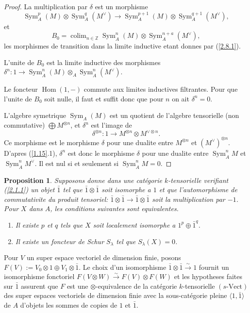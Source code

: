 \documentclass[11pt,a4paper]{article}
\theoremstyle{plain}
\newtheorem{proposition}[theorem]{Proposition}
\theoremstyle{definition}
\DeclareMathOperator{\Hom}{Hom}
\DeclareMathOperator{\Sym}{Sym}
\DeclareMathOperator*{\colim}{colim}
\newcommand{\Vect}{\mathrm{Vect}}
\begin{document}
\begin{proof}
La multiplication par $\delta$ est un morphisme
\begin{equation}\label{2.8.1}
\Sym^p_A(M)\otimes\Sym^q_A(M^\vee)\to\Sym^{p+1}_A(M)\otimes\Sym^{q+1}_A(M^\vee),
\end{equation}
et
\[
B_0=\colim_{n\in\mathbb{Z}}\Sym^n_A(M)\otimes\Sym^{n+a}_A(M^\vee),
\]
les morphismes de transition dans la limite inductive etant donnes par (\ref{2.8.1}).

L'unite de $B_0$ est la limite inductive des morphismes $\delta^n:1\to\Sym^n_A(M)\otimes_A\Sym^n_A(M^\vee)$.

Le foncteur $\Hom(1,{-})$ commute aux limites inductives filtrantes. Pour que l'unite de $B_0$ soit nulle, il faut et suffit donc que pour $n$ on ait $\delta^n=0$.

L'algebre symetrique $\Sym_A(M)$ est un quotient de l'algebre tensorielle (non commutative) $\bigoplus M^{\otimes n}$, et $\delta^n$ est l'image de
\[
\delta^{\otimes n}:1\to M^{\otimes n}\otimes M^{\vee\otimes n}.
\]
Ce morphisme est le morphisme $\delta$ pour une dualite entre $M^{\otimes n}$ et $(M^{\vee})^{\otimes n}$. D'apres (\ref{1.15}.1), $\delta^n$ est donc le morphisme $\delta$ pour une dualite entre $\Sym^n_A M$ et $\Sym^n_A M^\vee$. Il est nul si et seulement si $\Sym^n_A M=0$.
\end{proof}

\begin{proposition}\label{2.9}
Supposons donne dans une cat\'egorie $k$-tensorielle verifiant (\ref{2.1.1}) un objet $\bar{1}$ tel que $\bar{1}\otimes\bar{1}$ soit isomorphe a $1$ et que l'automorphisme de commutativite du produit tensoriel: $\bar{1}\otimes\bar{1}\to\bar{1}\otimes\bar{1}$ soit la multiplication par $-1$. Pour $X$ dans $A$, les conditions suivantes sont equivalentes.
\begin{enumerate}
\item[(i)] Il existe $p$ et $q$ tels que $X$ soit localement isomorphe a $1^p\oplus\bar{1}^q$.
\item[(ii)] Il existe un foncteur de Schur $S_\lambda$ tel que $S_\lambda(X)=0$.
\end{enumerate}
\end{proposition}

Pour $V$ un super espace vectoriel de dimension finie, posons $F(V):=V_0\otimes1\oplus V_1\otimes\bar{1}$. Le choix d'un isomorphisme $\bar{1}\otimes\bar{1}\xrightarrow{\sim}1$ fournit un isomorphisme fonctoriel $F(V\otimes W)\xrightarrow{\sim}F(V)\otimes F(W)$ et les hypotheses faites sur $\bar{1}$ assurent que $F$ est une $\otimes$-equivalence de la cat\'egorie $k$-tensorielle $(s\text{-}\Vect)$ des super espaces vectoriels de dimension finie avec la sous-cat\'egorie pleine $\langle1,\bar{1}\rangle$ de $A$ d'objets les sommes de copies de $1$ et $\bar{1}$.
\end{document}
